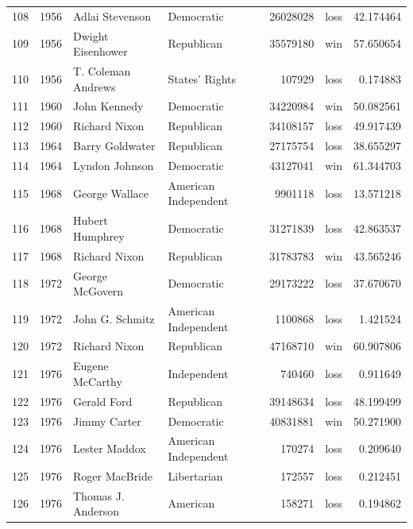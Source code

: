 \documentclass[
  letterpaper,
  DIV=11,
  numbers=noendperiod]{scrreprt}
\begin{document}
\begin{tabular}{lrllrlr}
108 &  1956 &         Adlai Stevenson &             Democratic &      26028028 &   loss &  42.174464 \\
109 &  1956 &       Dwight Eisenhower &             Republican &      35579180 &    win &  57.650654 \\
110 &  1956 &      T. Coleman Andrews &         States' Rights &        107929 &   loss &   0.174883 \\
111 &  1960 &            John Kennedy &             Democratic &      34220984 &    win &  50.082561 \\
112 &  1960 &           Richard Nixon &             Republican &      34108157 &   loss &  49.917439 \\
113 &  1964 &         Barry Goldwater &             Republican &      27175754 &   loss &  38.655297 \\
114 &  1964 &          Lyndon Johnson &             Democratic &      43127041 &    win &  61.344703 \\
115 &  1968 &          George Wallace &   American Independent &       9901118 &   loss &  13.571218 \\
116 &  1968 &         Hubert Humphrey &             Democratic &      31271839 &   loss &  42.863537 \\
117 &  1968 &           Richard Nixon &             Republican &      31783783 &    win &  43.565246 \\
118 &  1972 &         George McGovern &             Democratic &      29173222 &   loss &  37.670670 \\
119 &  1972 &         John G. Schmitz &   American Independent &       1100868 &   loss &   1.421524 \\
120 &  1972 &           Richard Nixon &             Republican &      47168710 &    win &  60.907806 \\
121 &  1976 &         Eugene McCarthy &            Independent &        740460 &   loss &   0.911649 \\
122 &  1976 &             Gerald Ford &             Republican &      39148634 &   loss &  48.199499 \\
123 &  1976 &            Jimmy Carter &             Democratic &      40831881 &    win &  50.271900 \\
124 &  1976 &           Lester Maddox &   American Independent &        170274 &   loss &   0.209640 \\
125 &  1976 &          Roger MacBride &            Libertarian &        172557 &   loss &   0.212451 \\
126 &  1976 &      Thomas J. Anderson &               American &        158271 &   loss &   0.194862 \\

\end{tabular}
\end{document}

